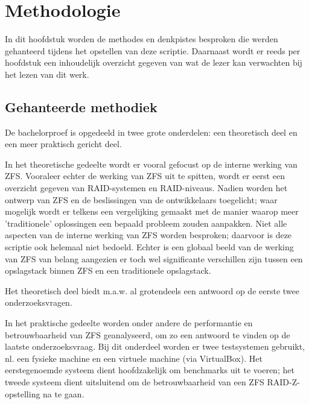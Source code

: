 
\chapter{Methodologie}
\label{ch:methodologie}


In dit hoofdstuk worden de methodes en denkpistes besproken die werden gehanteerd tijdens het opstellen van deze scriptie. Daarnaast wordt er reeds per hoofdstuk een inhoudelijk overzicht gegeven van wat de lezer kan verwachten bij het lezen van dit werk.

\section{Gehanteerde methodiek}

De bachelorproef is opgedeeld in twee grote onderdelen: een theoretisch deel en een meer praktisch gericht deel. 

In het theoretische gedeelte wordt er vooral gefocust op de interne werking van ZFS. Vooraleer echter de werking van ZFS uit te spitten, wordt er eerst een overzicht gegeven van RAID-systemen en RAID-niveaus. Nadien worden het ontwerp van ZFS en de beslissingen van de ontwikkelaars toegelicht; waar mogelijk wordt er telkens een vergelijking gemaakt met de manier waarop meer 'traditionele' oplossingen een bepaald probleem zouden aanpakken. Niet alle aspecten van de interne werking van ZFS worden besproken; daarvoor is deze scriptie ook helemaal niet bedoeld. Echter is een globaal beeld van de werking van ZFS van belang aangezien er toch wel significante verschillen zijn tussen een opslagstack binnen ZFS en een traditionele opslagstack. 

Het theoretisch deel biedt m.a.w. al grotendeels  een antwoord op de eerste twee onderzoeksvragen.

In het praktische gedeelte worden onder andere de performantie en betrouwbaarheid van ZFS geanalyseerd, om zo een antwoord te vinden op de laatste onderzoeksvraag. Bij dit onderdeel worden er twee testsystemen gebruikt, nl. een fysieke machine en een virtuele machine (via VirtualBox). Het eerstegenoemde systeem dient hoofdzakelijk om benchmarks uit te voeren; het tweede systeem dient uitsluitend om de betrouwbaarheid van een ZFS RAID-Z-opstelling na te gaan.

